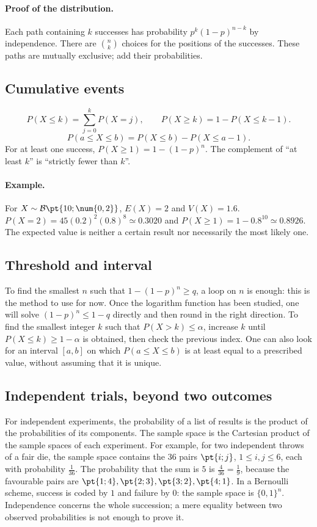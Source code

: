 \paragraph{Proof of the distribution.} Each path containing $k$ successes has probability $p^k(1-p)^{n-k}$ by independence. There are $\binom nk$ choices for the positions of the successes. These paths are mutually exclusive; add their probabilities.
\subsection{Cumulative events}
\[P(X\le k)=\sum_{j=0}^kP(X=j),\qquad P(X\ge k)=1-P(X\le k-1).\]\[P(a\le X\le b)=P(X\le b)-P(X\le a-1).\]
For at least one success, $P(X\ge1)=1-(1-p)^n$. The complement of ``at least $k$'' is ``strictly fewer than $k$''.
\paragraph{Example.} For $X\sim\mathcal B\pt{10;\num{0,2}}$, $E(X)=2$ and $V(X)=\num{1,6}$. $P(X=2)=45(\num{0,2})^2(\num{0,8})^8\simeq\num{0,3020}$ and $P(X\ge1)=1-\num{0,8}^{10}\simeq\num{0,8926}$. The expected value is neither a certain result nor necessarily the most likely one.
\subsection{Threshold and interval}
To find the smallest $n$ such that $1-(1-p)^n\ge q$, a loop on $n$ is enough: this is the method to use for now. Once the logarithm function has been studied, one will solve $(1-p)^n\le1-q$ directly and then round in the right direction.
To find the smallest integer $k$ such that $P(X>k)\le\alpha$, increase $k$ until $P(X\le k)\ge1-\alpha$ is obtained, then check the previous index. One can also look for an interval $[a,b]$ on which $P(a\le X\le b)$ is at least equal to a prescribed value, without assuming that it is unique.
\subsection{Independent trials, beyond two outcomes}
For independent experiments, the probability of a list of results is the product of the probabilities of its components. The sample space is the Cartesian product of the sample spaces of each experiment. For example, for two independent throws of a fair die, the sample space contains the $36$ pairs $\pt{i;j}$, $1\le i,j\le6$, each with probability $\frac{1}{36}$. The probability that the sum is $5$ is $\frac{4}{36}=\frac{1}{9}$, because the favourable pairs are $\pt{1;4},\pt{2;3},\pt{3;2},\pt{4;1}$.
In a Bernoulli scheme, success is coded by $1$ and failure by $0$: the sample space is $\{0,1\}^n$. Independence concerns the whole succession; a mere equality between two observed probabilities is not enough to prove it.


